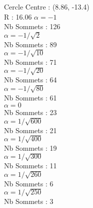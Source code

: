 \documentclass{beamer}
\begin{document}
\begin{frame}
\begin{columns}[t]
\begin{column}{4cm}
\begin{exampleblock}{Cercle}
      {
        Centre : (8.86, -13.4)\\
        R : 16.06
      }
      {
        $\alpha = -1$\\
         Nb Sommets : 126\\
      }
      {
        $\alpha = -1/\sqrt{2}$\\
        Nb Sommets : 89\\
      }
      {
        $\alpha = -1/\sqrt{10}$\\
         Nb Sommets : 71\\
      }
      {
        $\alpha = -1/\sqrt{20}$\\
         Nb Sommets : 64\\
      }
      {
        $\alpha = -1/\sqrt{80}$\\
         Nb Sommets : 61\\
      }
      {
        $\alpha = 0$\\
         Nb Sommets : 23\\
      }
      {
        $\alpha = 1/\sqrt{600}$\\
         Nb Sommets : 21\\
      }
      {
        $\alpha = 1/\sqrt{400}$\\
         Nb Sommets : 19\\
      }
      {
        $\alpha = 1/\sqrt{300}$\\
         Nb Sommets : 11\\
      }
      {
        $\alpha = 1/\sqrt{260}$\\
         Nb Sommets : 6\\
      }
      {
        $\alpha = 1/\sqrt{250}$\\
         Nb Sommets : 3\\
      }
    \end{exampleblock}

    
  \end{column}


\end{columns}
\end{frame}
\end{document}
